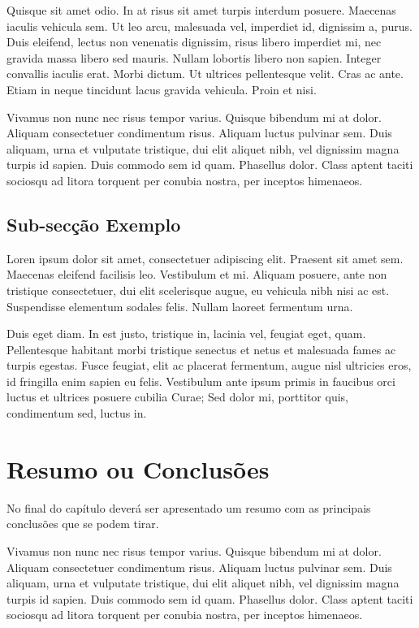 Quisque sit amet odio. In at risus sit amet turpis interdum
posuere. Maecenas iaculis vehicula sem. Ut leo arcu, malesuada vel,
imperdiet id, dignissim a, purus. Duis eleifend, lectus non venenatis
dignissim, risus libero imperdiet mi, nec gravida massa libero sed
mauris. Nullam lobortis libero non sapien. Integer convallis iaculis
erat. Morbi dictum. Ut ultrices pellentesque velit. Cras ac
ante. Etiam in neque tincidunt lacus gravida vehicula. Proin et nisi. 

Vivamus non nunc nec risus tempor varius. Quisque bibendum mi at
dolor. Aliquam consectetuer condimentum risus. Aliquam luctus pulvinar
sem. Duis aliquam, urna et vulputate tristique, dui elit aliquet nibh,
vel dignissim magna turpis id sapien. Duis commodo sem id
quam. Phasellus dolor. Class aptent taciti sociosqu ad litora torquent
per conubia nostra, per inceptos himenaeos. 

\subsection{Sub-secção Exemplo}

Loren ipsum dolor sit amet, consectetuer adipiscing elit. 
Praesent sit amet sem. Maecenas eleifend facilisis leo. Vestibulum et
mi. Aliquam posuere, ante non tristique consectetuer, dui elit
scelerisque augue, eu vehicula nibh nisi ac est. Suspendisse elementum
sodales felis. Nullam laoreet fermentum urna. 

Duis eget diam. In est justo, tristique in, lacinia vel, feugiat eget,
quam. Pellentesque habitant morbi tristique senectus et netus et
malesuada fames ac turpis egestas. Fusce feugiat, elit ac placerat
fermentum, augue nisl ultricies eros, id fringilla enim sapien eu
felis. Vestibulum ante ipsum primis in faucibus orci luctus et
ultrices posuere cubilia Curae; Sed dolor mi, porttitor quis,
condimentum sed, luctus in. 

\section{Resumo ou Conclusões}

No final do capítulo deverá ser apresentado um resumo com as 
principais conclusões que se podem tirar. 

Vivamus non nunc nec risus tempor varius. Quisque bibendum mi at
dolor. Aliquam consectetuer condimentum risus. Aliquam luctus pulvinar
sem. Duis aliquam, urna et vulputate tristique, dui elit aliquet nibh,
vel dignissim magna turpis id sapien. Duis commodo sem id
quam. Phasellus dolor. Class aptent taciti sociosqu ad litora torquent
per conubia nostra, per inceptos himenaeos. 

